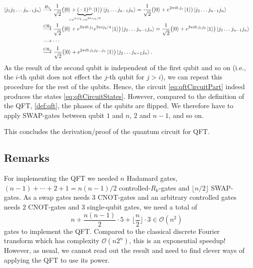 			\begin{align}
				\ket{j_1 j_2 \dots j_{n - 1} j_n}
					&\overset{H_1}{\longto}
						\frac{1}{\sqrt{2}} \bigl( \ket{0} + \underbrace{(-1)^{j_1}}_{\mathclap{= e^{\pi i j_1} = e^{2 \pi i j_1 / 2}}} \ket{1} \bigr) \ket{j_2 \dots j_{n - 1} j_n}
							= \frac{1}{\sqrt{2}} \bigl( \ket{0} + e^{2 \pi i 0.j_1} \ket{1}) \ket{j_2 \dots j_{n - 1} j_n} \\
					&\overset{\mathit{CR}_2}{\longto}
						\frac{1}{\sqrt{2}} \bigl( \ket{0} + e^{2 \pi i 0.j_1} e^{2 \pi i j_2 / 4} \ket{1} \bigr) \ket{j_2 \dots j_{n - 1} j_n}
							= \frac{1}{\sqrt{2}} \bigl( \ket{0} + e^{2 \pi i 0.j_1 j_2} \ket{1} \bigr) \ket{j_2 \dots j_{n - 1} j_n} \\
					&\longto \cdots \\
					&\overset{\mathit{CR}_n}{\longto}
							\frac{1}{\sqrt{2}} \bigl( \ket{0} + e^{2 \pi i 0.j_1 j_2 \dots j_n} \ket{1} \bigr) \ket{j_2 \dots j_{n - 1} j_n}.
			\end{align}
			As the result of the second qubit is independent of the first qubit and so on (i.e., the \(i\)-th qubit does not effect the \(j\)-th qubit for \(j > i\)), we can repeat this procedure for the rest of the qubits. Hence, the circuit \eqref{eq:qftCircuitPart} indeed produces the states \eqref{eq:qftCircuitStates}. However, compared to the definition of the \ac{QFT}, \autoref{def:qft}, the phases of the qubits are flipped. We therefore have to apply SWAP-gates between qubit \(1\) and \(n\), \(2\) and \(n - 1\), and so on.

			This concludes the derivation/proof of the quantum circuit for \ac{QFT}.

		\subsection{Remarks}
			For implementing the \ac{QFT} we needed \(n\) Hadamard gates, \( (n - 1) + \cdots + 2 + 1 = n (n - 1) / 2 \) controlled-\(R_k\)-gates and \( \lfloor n/2 \rfloor \) SWAP-gates. As a swap gates needs \(3\) CNOT-gates and an arbitrary controlled gates needs \(2\) CNOT-gates and \(3\) single-qubit gates, we need a total of
			\begin{equation}
				n + \frac{n (n - 1)}{2} \cdot 5 + \biggl\lfloor \frac{n}{2} \biggr\rfloor \cdot 3 \in \mathcal{O}(n^2)
			\end{equation}
			gates to implement the \acl{QFT}. Compared to the classical discrete Fourier transform which has complexity \( \mathcal{O}(n 2^n) \), this is an exponential speedup! However, as usual, we cannot read out the result and need to find clever ways of applying the \ac{QFT} to use its power.

